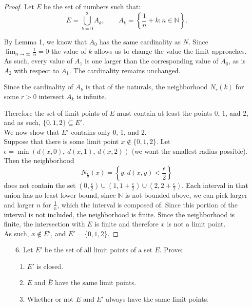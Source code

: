 \documentclass[10pt]{article}
\theoremstyle{definition}
\theoremstyle{plain}
\newcommand{\N}{\mathbb{N}}
\begin{document}
\begin{proof}
Let $E$ be the set of numbers such that:
$$E = \bigcup_{k=0}^{2} A_k, \qquad A_k = \left\{\frac{1}{n} + k: n\in\N\right\}.$$

By Lemma 1, we know that $A_0$ has the same cardinality as $N$. Since $\lim_{n\rightarrow\infty} \frac{1}{n} = 0$ the value of $k$ allows us to change the value the limit approaches. As such, every value of $A_1$ is one larger than the corresponding value of $A_0$, as is $A_2$ with respect to $A_1$. The cardinality remains unchanged.

Since the cardinality of $A_k$ is that of the naturals, the neighborhood $N_r(k)$ for some $r>0$ intersect $A_k$ is infinite.

Therefore the set of limit points of $E$ must contain at least the points 0, 1, and 2, and as such, $\{0,1,2\}\subseteq E'$. \\

We now show that $E'$ contains only 0, 1, and 2. \\

Suppose that there is some limit point $x\not\in\{0,1,2\}$. Let $\epsilon = \min(d(x,0),\ d(x,1),\ d(x,2))$ (we want the smallest radius possible). Then the neighborhood
$$N_\frac{\epsilon}{2} (x) = \left\{y: d(x,y) < \frac{\epsilon}{2}\right\}$$
does not contain the set $(0, \frac{\epsilon}{2})\cup(1, 1+\frac{\epsilon}{2})\cup(2, 2+\frac{\epsilon}{2})$. Each interval in that union has no least lower bound, since $\N$ is not bounded above, we can pick larger and larger $n$ for $\frac{1}{n}$, which the interval is composed of. Since this portion of the interval is not included, the neighborhood is finite. Since the neighborhood is finite, the intersection with $E$ is finite and therefore $x$ is not a limit point. \\

As such, $x\not\in E'$, and $E' = \{0,1,2\}$.
\end{proof}



\pagebreak



\begin{enumerate}
\item[6.] Let $E'$ be the set of all limit points of a set $E$. Prove:
\begin{enumerate}
  \item $E'$ is closed.
  \item $E$ and $\bar{E}$ have the same limit points.
  \item Whether or not $E$ and $E'$ always have the same limit points.
\end{enumerate}
\end{enumerate}
\end{document}
